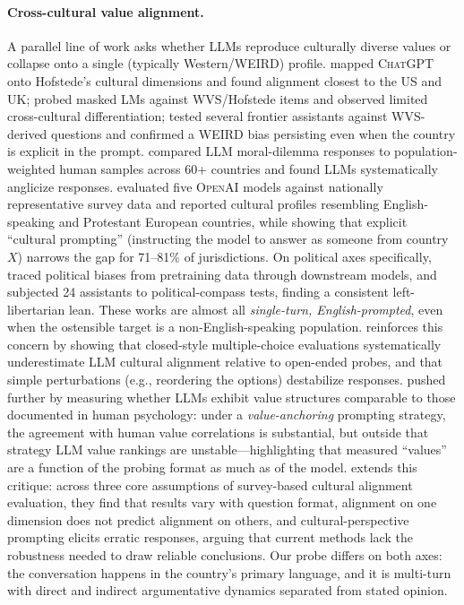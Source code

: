 \documentclass[11pt,a4paper]{article}
\begin{document}
\paragraph{Cross-cultural value alignment.} A parallel line of work asks whether LLMs reproduce culturally diverse values or collapse onto a single (typically Western/WEIRD) profile. \citet{cao2023assessing} mapped \textsc{ChatGPT} onto Hofstede's cultural dimensions and found alignment closest to the US and UK; \citet{arora2023probing} probed masked LMs against \textsc{WVS}/Hofstede items and observed limited cross-cultural differentiation; \citet{kharchenko2024howwell} tested several frontier assistants against WVS-derived questions and confirmed a WEIRD bias persisting even when the country is explicit in the prompt. \citet{atari2023whichhumans} compared LLM moral-dilemma responses to population-weighted human samples across 60+ countries and found LLMs systematically anglicize responses. \citet{tao2024cultural} evaluated five \textsc{OpenAI} models against nationally representative survey data and reported cultural profiles resembling English-speaking and Protestant European countries, while showing that explicit ``cultural prompting'' (instructing the model to answer as someone from country~$X$) narrows the gap for 71--81\% of jurisdictions. On political axes specifically, \citet{feng2023pretraining} traced political biases from pretraining data through downstream models, and \citet{rozado2024political} subjected 24 assistants to political-compass tests, finding a consistent left-libertarian lean. These works are almost all \emph{single-turn, English-prompted}, even when the ostensible target is a non-English-speaking population. \citet{kabir2025break} reinforces this concern by showing that closed-style multiple-choice evaluations systematically underestimate LLM cultural alignment relative to open-ended probes, and that simple perturbations (e.g., reordering the options) destabilize responses. \citet{rozen2024llmconsistent} pushed further by measuring whether LLMs exhibit value structures comparable to those documented in human psychology: under a \emph{value-anchoring} prompting strategy, the agreement with human value correlations is substantial, but outside that strategy LLM value rankings are unstable---highlighting that measured ``values'' are a function of the probing format as much as of the model. \citet{khan2025randomness} extends this critique: across three core assumptions of survey-based cultural alignment evaluation, they find that results vary with question format, alignment on one dimension does not predict alignment on others, and cultural-perspective prompting elicits erratic responses, arguing that current methods lack the robustness needed to draw reliable conclusions. Our probe differs on both axes: the conversation happens in the country's primary language, and it is multi-turn with direct and indirect argumentative dynamics separated from stated opinion.
\end{document}
